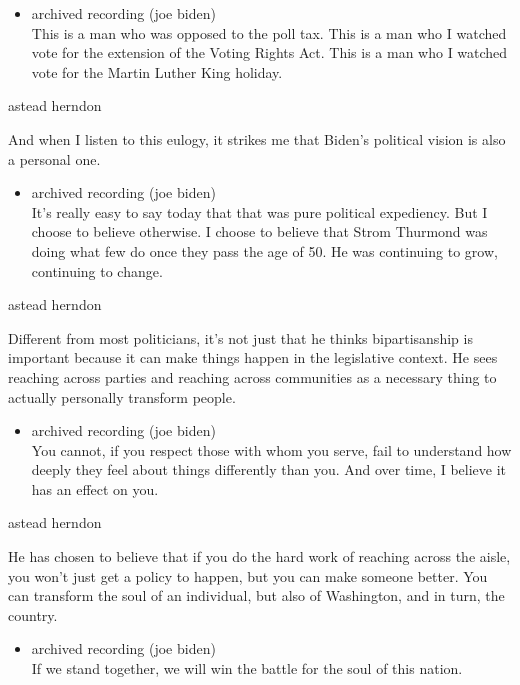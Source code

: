 \begin{itemize}
\tightlist
\item
  archived recording (joe biden)\\
  This is a man who was opposed to the poll tax. This is a man who I
  watched vote for the extension of the Voting Rights Act. This is a man
  who I watched vote for the Martin Luther King holiday.
\end{itemize}

astead herndon

And when I listen to this eulogy, it strikes me that Biden's political
vision is also a personal one.

\begin{itemize}
\tightlist
\item
  archived recording (joe biden)\\
  It's really easy to say today that that was pure political expediency.
  But I choose to believe otherwise. I choose to believe that Strom
  Thurmond was doing what few do once they pass the age of 50. He was
  continuing to grow, continuing to change.
\end{itemize}

astead herndon

Different from most politicians, it's not just that he thinks
bipartisanship is important because it can make things happen in the
legislative context. He sees reaching across parties and reaching across
communities as a necessary thing to actually personally transform
people.

\begin{itemize}
\tightlist
\item
  archived recording (joe biden)\\
  You cannot, if you respect those with whom you serve, fail to
  understand how deeply they feel about things differently than you. And
  over time, I believe it has an effect on you.
\end{itemize}

astead herndon

He has chosen to believe that if you do the hard work of reaching across
the aisle, you won't just get a policy to happen, but you can make
someone better. You can transform the soul of an individual, but also of
Washington, and in turn, the country.

\begin{itemize}
\tightlist
\item
  archived recording (joe biden)\\
  If we stand together, we will win the battle for the soul of this
  nation.
\end{itemize}

